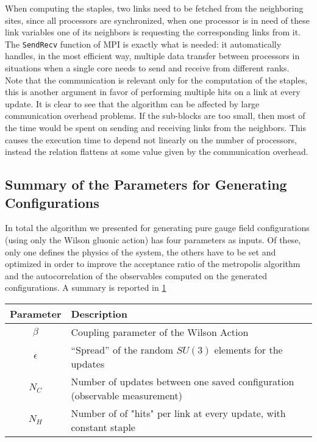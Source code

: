  

When computing the staples, two links need to be fetched from the neighboring sites, since all processors are synchronized, when one processor is in need of these link variables one of its neighbors is requesting the corresponding links from it. The \texttt{SendRecv} function of MPI is exactly what is needed: it automatically handles, in the most efficient way, multiple data transfer between processors in situations when a single core needs to send and receive from different ranks. \\ 
Note that the communication is relevant only for the computation of the staples, this is another argument in favor of performing multiple hits on a link at every update. It is clear to see that the algorithm can be affected by large communication overhead problems. If the sub-blocks are too small, then most of the time would be spent on sending and receiving links from the neighbors. This causes the execution time to depend not linearly on the number of processors, instead the relation flattens at some value given by the communication overhead.

\subsection{Summary of the Parameters for Generating Configurations}
In total the algorithm we presented for generating pure gauge field configurations (using only the Wilson gluonic action) has four parameters as inputs. Of these, only one defines the physics of the system, the others have to be set and optimized in order to improve the acceptance ratio of the metropolis algorithm and the autocorrelation of the observables computed on the generated configurations. A summary is reported in \cref{MC:params}
 
\begin{table}[!htb]
    \begin{center}
\begin{tabular}{cl}
    Parameter & Description\\\hline
    $\beta$ & Coupling parameter of the Wilson Action\\
    $\epsilon$ & ``Spread'' of the random $SU(3)$ elements for the updates\\
    $N_C$ & Number of updates between one saved configuration (observable measurement)\\
    $N_H$ & Number of of "hits" per link at every update, with constant staple 
\end{tabular}
\label{MC:params}
\end{center}
\end{table}
 
